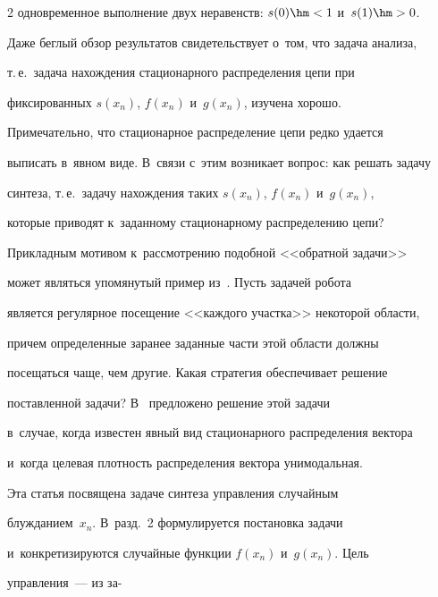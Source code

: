 \begin{multicols}{2}
одновременное выполнение двух неравенств: $s(0)\hm<1$ и~$s(1)\hm>0$.


  


  Даже беглый обзор результатов свидетельствует о~том, что задача анализа, 


т.\,е.\ задача нахождения стационарного распределения цепи при 


фиксированных $s(x_n)$, $f(x_n)$ и~$g(x_n)$, изучена хорошо. 


Примечательно, что стационарное распределение цепи редко удается 


выписать в~явном виде. В~связи с~этим возникает вопрос: как решать задачу 


синтеза, т.\,е.\ задачу на\-хож\-де\-ния таких $s(x_n)$, $f(x_n)$ и~$g(x_n)$, 


которые приводят к~заданному стационарному распределению цепи? 





Прикладным мотивом к~рас\-смот\-ре\-нию по\-доб\-ной <<обратной задачи>> 


может являться упомянутый пример из~\cite{3-kr}. Пусть задачей робота 


является регулярное посещение <<каж\-до\-го участка>> некоторой об\-ласти, 


причем определенные заранее заданные час\-ти этой об\-ласти должны 


посещаться чаще, чем другие. Какая стратегия обеспечивает решение 


поставленной задачи? В~\cite{3-kr} предложено решение этой задачи 


в~случае, когда известен явный вид стационарного распределения вектора 


и~когда целевая плот\-ность распределения вектора уни\-мо\-дальная.


{





}


  


  Эта статья посвящена задаче синтеза управ\-ле\-ния случайным 


блуж\-да\-ни\-ем~$x_n$. В~разд.~2 формулируется постановка задачи 


и~конкретизируются случайные функции $f(x_n)$ и~$g(x_n)$. Цель 


управления~--- из за-\linebreak\vspace*{-12pt}






\end{multicols}
